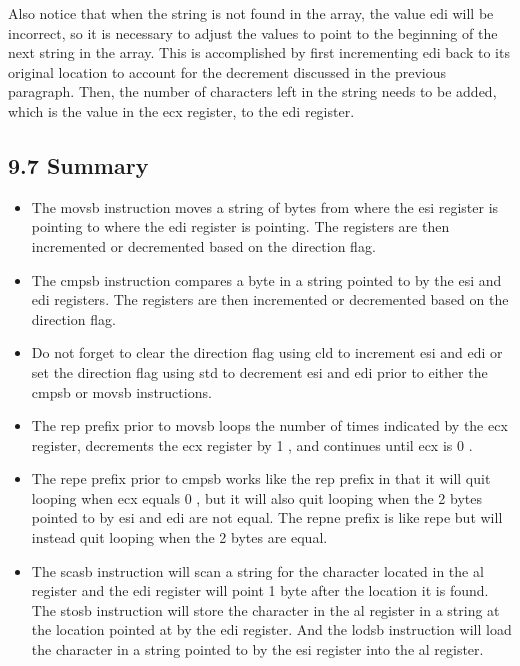 \documentclass[10pt]{article}
\begin{document}
Also notice that when the string is not found in the array, the value edi will be incorrect, so it is necessary to adjust the values to point to the beginning of the next string in the array. This is accomplished by first incrementing edi back to its original location to account for the decrement discussed in the previous paragraph. Then, the number of characters left in the string needs to be added, which is the value in the ecx register, to the edi register.

\subsection*{9.7 Summary}
\begin{itemize}
  \item The movsb instruction moves a string of bytes from where the esi register is pointing to where the edi register is pointing. The registers are then incremented or decremented based on the direction flag.
  \item The cmpsb instruction compares a byte in a string pointed to by the esi and edi registers. The registers are then incremented or decremented based on the direction flag.
  \item Do not forget to clear the direction flag using cld to increment esi and edi or set the direction flag using std to decrement esi and edi prior to either the cmpsb or movsb instructions.
  \item The rep prefix prior to movsb loops the number of times indicated by the ecx register, decrements the ecx register by 1 , and continues until ecx is 0 .
  \item The repe prefix prior to cmpsb works like the rep prefix in that it will quit looping when ecx equals 0 , but it will also quit looping when the 2 bytes pointed to by esi and edi are not equal. The repne prefix is like repe but will instead quit looping when the 2 bytes are equal.
  \item The scasb instruction will scan a string for the character located in the al register and the edi register will point 1 byte after the location it is found. The stosb instruction will store the character in the al register in a string at the location pointed at by the edi register. And the lodsb instruction will load the character in a string pointed to by the esi register into the al register.
\end{itemize}
\end{document}
